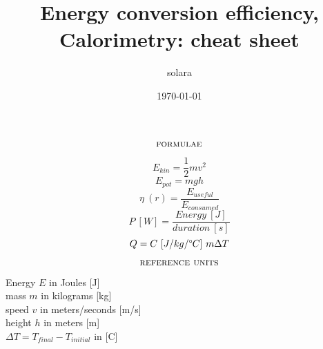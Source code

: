 \documentclass[11pt]{article}
\title{Energy conversion efficiency, Calorimetry: cheat sheet}
\author{solara}
\date{\today}
\begin{document}
  \maketitle

  $$\textsc{formulae}$$

  $$E_{kin} = \frac{1}{2}m v^2$$
  $$E_{pot} = mgh$$
  $$\eta\ (r) = \frac{E_{useful}}{E_{consumed}} $$
  $$P\ [W] = \frac{Energy\ [J]}{duration\ [s]}$$
  $$Q=C\ [J/kg/\degree C]\ m\Delta T$$

  $$\textsc{reference units}$$

  \begin{center}
    Energy $E$ in Joules [J] \\
    mass $m$ in kilograms [kg] \\
    speed $v$ in meters/seconds [m/s] \\
    height $h$ in meters [m] \\
    $\Delta T = T_{final}-T_{initial}$ in [\degree C]
  \end{center}
\end{document}

